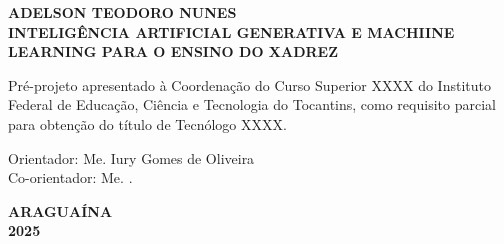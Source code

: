 \vfill
\begin{center}

    {\normalsize\textbf{ADELSON TEODORO NUNES}\\}
    \vspace{6cm}
    {\normalsize\bfseries{INTELIGÊNCIA ARTIFICIAL GENERATIVA  E MACHIINE LEARNING PARA O ENSINO DO XADREZ}\\}
    \vspace{2cm}
    \hspace{.45\linewidth}
    \begin{minipage}{.50\linewidth}

            Pré-projeto apresentado à Coordenação do Curso Superior XXXX do Instituto Federal de Educação, Ciência e Tecnologia do Tocantins, como requisito parcial para obtenção do título de Tecnólogo XXXX.

    \vspace{1cm}
    
    {\raggedright{ Orientador: Me.  Iury Gomes de Oliveira\\
    			Co-orientador: Me.  .}\\}
    
                         
    \end{minipage}
    \vspace{2cm}
    \vfill
    {\normalsize\textbf{ARAGUAÍNA\\ 2025}}
\end{center}

